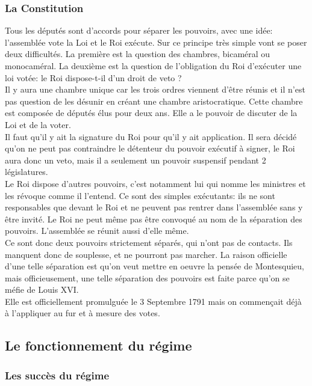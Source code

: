 \documentclass[10pt, a4paper, openany]{book}
\begin{document}
\subsubsection{La Constitution}

Tous les députés sont d'accords pour séparer les pouvoirs, avec une idée: l'assemblée vote la Loi et le Roi exécute. Sur ce principe très simple vont se poser deux difficultés. La première est la question des chambres, bicaméral ou monocaméral. La deuxième est la question de l'obligation du Roi d'exécuter une loi votée: le Roi dispose-t-il d'un droit de veto ? \\
Il y aura une chambre unique car les trois ordres viennent d'être réunis et il n'est pas question de les désunir en créant une chambre aristocratique. Cette chambre est composée de députés élus pour deux ans. Elle a le pouvoir de discuter de la Loi et de la voter. \\
Il faut qu'il y ait la signature du Roi pour qu'il y ait application. Il sera décidé qu'on ne peut pas contraindre le détenteur du pouvoir exécutif à signer, le Roi aura donc un veto, mais il a seulement un pouvoir suspensif pendant 2 législatures. \\
Le Roi dispose d'autres pouvoirs, c'est notamment lui qui nomme les ministres et les révoque comme il l'entend. Ce sont des simples exécutants: ils ne sont responsables que devant le Roi et ne peuvent pas rentrer dans l'assemblée sans y être invité. Le Roi ne peut même pas être convoqué au nom de la séparation des pouvoirs. L'assemblée se réunit aussi d'elle même. \\
Ce sont donc deux pouvoirs strictement séparés, qui n'ont pas de contacts. Ils manquent donc de souplesse, et ne pourront pas marcher. La raison officielle d'une telle séparation est qu'on veut mettre en oeuvre la pensée de Montesquieu, mais officieusement, une telle séparation des pouvoirs est faite parce qu'on se méfie de Louis XVI. \\
Elle est officiellement promulguée le 3 Septembre 1791 mais on commençait déjà à l'appliquer au fur et à mesure des votes. 

\subsection{Le fonctionnement du régime}

\subsubsection{Les succès du régime}
\end{document}
